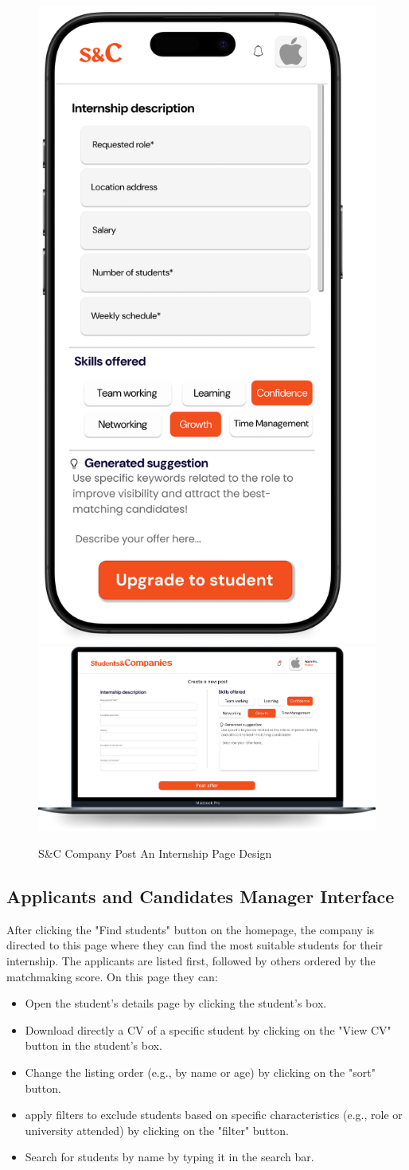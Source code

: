 \begin{figure}[H]
    \centering
    \includegraphics[width=0.2\linewidth]{Images/Mock-up/mobile post an internship.png}
    \includegraphics[width=0.75\linewidth]{Images/Mock-up/Post an internship.png}
    \caption{S\&C Company Post An Internship Page Design}
    \label{fig:homepage-design}
\end{figure}

\subsection{Applicants and Candidates Manager Interface}

After clicking the "Find students" button on the homepage, the company is directed to this page where they can find the most suitable students for their internship. The applicants are listed first, followed by others ordered by the matchmaking score. On this page they can:

\begin{itemize} 
    \item Open the student's details page by clicking the student's box. 
    \item Download directly a CV of a specific student by clicking on the "View CV" button in the student's box. 
    \item Change the listing order (e.g., by name or age) by clicking on the "sort" button. 
    \item apply filters to exclude students based on specific characteristics (e.g., role or university attended) by clicking on the "filter" button. 
    \item Search for students by name by typing it in the search bar. 
\end{itemize} \\

